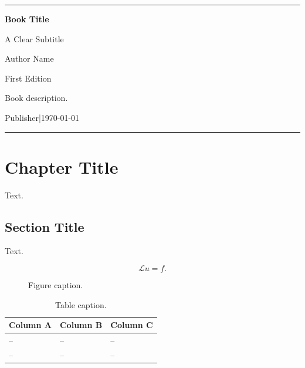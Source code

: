\documentclass[11pt,a4paper,openany]{book}
\newcommand{\BookTitle}{Book Title}
\newcommand{\BookSubtitle}{A Clear Subtitle}
\newcommand{\BookAuthor}{Author Name}
\newcommand{\BookPublisher}{Publisher}
\newcommand{\BookEdition}{First Edition}
\newcommand{\BookDate}{\today}
\newcommand{\BookDescription}{Book description.}
\theoremstyle{bookplain}
\theoremstyle{bookdefinition}
\theoremstyle{remark}
\newcommand{\MakeBookTitle}{
\begin{titlepage}
\centering
\vspace*{1.2cm}
{\color{BookAccent}\rule{\textwidth}{1.1pt}}\par
\vspace{2.0cm}
{\Huge\bfseries\color{BookBlue}\BookTitle\par}
\vspace{0.65cm}
{\Large\color{BookMuted}\BookSubtitle\par}
\vspace{1.7cm}
{\Large\BookAuthor\par}
\vspace{0.8cm}
{\normalsize\BookEdition\par}
\vfill
\begin{minipage}{0.78\textwidth}
\centering
\small\color{BookMuted}\BookDescription
\end{minipage}
\vfill
{\small \BookPublisher\quad|\quad \BookDate\par}
\vspace{0.7cm}
{\color{BookAccent}\rule{0.55\textwidth}{0.8pt}}\par
\end{titlepage}
}
\begin{document}
\frontmatter
\MakeBookTitle
\tableofcontents

\mainmatter


\chapter{Chapter Title}

Text.

\section{Section Title}

Text.

\begin{equation}
  \mathcal{L}u = f .
\end{equation}

\begin{figure}[htbp]
\centering
\fbox{\rule{0pt}{1.8in}\rule{0.85\textwidth}{0pt}}
\caption{Figure caption.}
\end{figure}

\begin{table}[htbp]
\caption{Table caption.}
\begin{tabularx}{\textwidth}{YYY}
\toprule
Column A & Column B & Column C \\
\midrule
-- & -- & -- \\
-- & -- & -- \\
\bottomrule
\end{tabularx}
\end{table}

\backmatter

\end{document}
